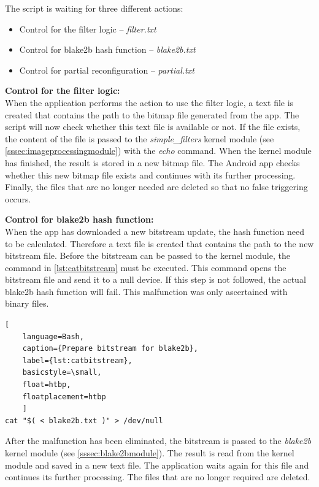 The script is waiting for three different actions:
\begin{itemize}
    \item Control for the filter logic -- \emph{filter.txt}
    \item Control for blake2b hash function -- \emph{blake2b.txt}
    \item Control for partial reconfiguration -- \emph{partial.txt}
\end{itemize}

\textbf{Control for the filter logic:}\\
When the application performs the action to use the filter logic, a text file is created that contains the path to the bitmap file generated from the app.
The script will now check whether this text file is available or not. If the file exists, the content of the file is passed to the \emph{simple_filters} kernel module (see \cref{sssec:imageprocessingmodule}) with the \emph{echo} command. When the kernel module has finished, the result is stored in a new bitmap file.
The Android app checks whether this new bitmap file exists and continues with its further processing.
Finally, the files that are no longer needed are deleted so that no false triggering occurs.
\medbreak

\textbf{Control for blake2b hash function:}\\
When the app has downloaded a new bitstream update, the hash function need to be calculated. Therefore a text file is created that contains the path to the new bitstream file. Before the bitstream can be passed to the kernel module, the command in \cref{lst:catbitstream} must be executed. This command opens the bitstream file and send it to a null device. If this step is not followed, the actual blake2b hash function will fail. This malfunction was only ascertained with binary files. 
\begin{lstlisting}[
	language=Bash,
	caption={Prepare bitstream for blake2b},
	label={lst:catbitstream},
	basicstyle=\small,
	float=htbp,
	floatplacement=htbp
	]
cat "$( < blake2b.txt )" > /dev/null
\end{lstlisting}

After the malfunction has been eliminated, the bitstream is passed to the \emph{blake2b} kernel module (see \cref{sssec:blake2bmodule}). The result is read from the kernel module and saved in a new text file. 
The application waits again for this file and continues its further processing. 
The files that are no longer required are deleted.
\medbreak

